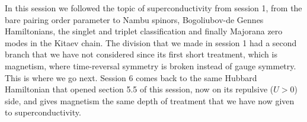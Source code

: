 In this session we followed the topic of superconductivity from session 1, from the bare pairing
order parameter to Nambu spinors, Bogoliubov-de Gennes Hamiltonians, the singlet and triplet
classification and finally Majorana zero modes in the Kitaev chain. The division that we made in
session 1 had a second branch that we have not considered since its first short treatment, which is
magnetism, where time-reversal symmetry is broken instead of gauge symmetry. This is where we go
next. Session 6 comes back to the same Hubbard Hamiltonian that opened section 5.5 of this session,
now on its repulsive ($U>0$) side, and gives magnetism the same depth of treatment that we have now
given to superconductivity.
